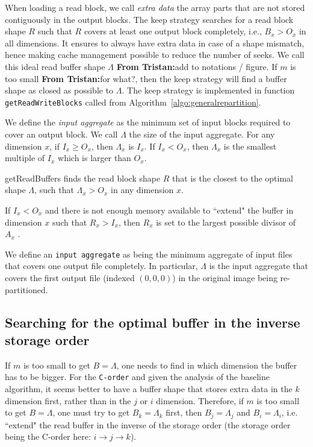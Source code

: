 \documentclass[sigconf, nonacm]{acmart}
\newcommand{\tristan}[1]{\color{orange}\textbf{From Tristan:}#1\color{black}}
\begin{document}


When loading a read block, we call \emph{extra data} the array parts that
are not stored contiguously in the output blocks. The keep strategy
searches for a read block shape $R$ such that $R$ covers at least one
output block completely, i.e., $B_x>O_x$ in all dimensions. It ensures to
always have extra data in case of a shape mismatch, hence making cache
management possible to reduce the number of seeks. We call this ideal read
buffer shape $\Lambda$ \tristan{add to notations / figure}. If $m$ is too
small \tristan{for what?}, then the keep strategy will find a buffer shape
as closed as possible to $\Lambda$. The keep strategy is implemented in
function \texttt{getReadWriteBlocks} called from
Algorithm~\ref{algo:generalrepartition}.

We define the \emph{input aggregate} as the minimum set of input blocks required to 
cover an output block. We call $\Lambda$ the size of the input aggregate. 
For any dimension $x$, if $I_x \geq O_x$, then $\Lambda_x$ is $I_x$. If $I_x < O_x$, then
$\Lambda_x$ is the smallest multiple of $I_x$ which is larger than $O_x$. 


getReadBuffers finds the read block shape $R$ that is the closest to the optimal
shape $\Lambda$, such that $\Lambda_x>O_x$ in any dimension $x$.




If $I_x < O_x$ and there is not enough memory available to ``extend"
the buffer in dimension $x$ such that $R_x > I_x$, then $R_x$ is set to the
largest possible divisor of $A_x$ .

We define an \texttt{input aggregate} as being the minimum aggregate of input
files that covers one output file completely. In particular, $\Lambda$ is the
input aggregate that covers the first output file (indexed $(0,0,0)$) in the
original image being re-partitioned.

\subsection{Searching for the optimal buffer in the inverse storage order}
If $m$ is too small to get $B=\Lambda$, one needs to find in which dimension
the buffer has to be bigger.
For the \texttt{C-order} and given the analysis of the baseline algorithm,
it seems better to have a buffer shape that stores extra data in the $k$
dimension first, rather than in the $j$ or $i$ dimension.
Therefore, if $m$ is too small to get $B=\Lambda$, one must try to get
$B_k=\Lambda_k$ first, then $B_j=\Lambda_j$ and $B_i=\Lambda_i$, i.e. ``extend"
the read buffer in the inverse of the storage order (the storage order being the
C-order here: $i\rightarrow j\rightarrow k$).
\end{document}
